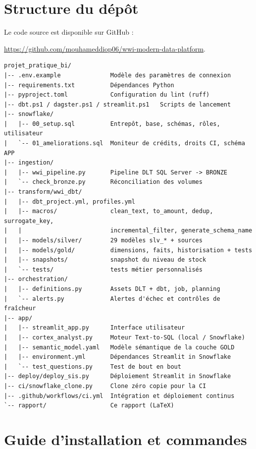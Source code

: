 \chapter{Structure du dépôt}
\label{ann:depot}

Le code source est disponible sur GitHub :

\url{https://github.com/mouhameddiop06/wwi-modern-data-platform}.

\begin{lstlisting}[language={}, numbers=none, caption={Arborescence du projet}]
projet_pratique_bi/
|-- .env.example              Modèle des paramètres de connexion
|-- requirements.txt          Dépendances Python
|-- pyproject.toml            Configuration du lint (ruff)
|-- dbt.ps1 / dagster.ps1 / streamlit.ps1   Scripts de lancement
|-- snowflake/
|   |-- 00_setup.sql          Entrepôt, base, schémas, rôles, utilisateur
|   `-- 01_ameliorations.sql  Moniteur de crédits, droits CI, schéma APP
|-- ingestion/
|   |-- wwi_pipeline.py       Pipeline DLT SQL Server -> BRONZE
|   `-- check_bronze.py       Réconciliation des volumes
|-- transform/wwi_dbt/
|   |-- dbt_project.yml, profiles.yml
|   |-- macros/               clean_text, to_amount, dedup, surrogate_key,
|   |                         incremental_filter, generate_schema_name
|   |-- models/silver/        29 modèles slv_* + sources
|   |-- models/gold/          dimensions, faits, historisation + tests
|   |-- snapshots/            snapshot du niveau de stock
|   `-- tests/                tests métier personnalisés
|-- orchestration/
|   |-- definitions.py        Assets DLT + dbt, job, planning
|   `-- alerts.py             Alertes d'échec et contrôles de fraîcheur
|-- app/
|   |-- streamlit_app.py      Interface utilisateur
|   |-- cortex_analyst.py     Moteur Text-to-SQL (local / Snowflake)
|   |-- semantic_model.yaml   Modèle sémantique de la couche GOLD
|   |-- environment.yml       Dépendances Streamlit in Snowflake
|   `-- test_questions.py     Test de bout en bout
|-- deploy/deploy_sis.py      Déploiement Streamlit in Snowflake
|-- ci/snowflake_clone.py     Clone zéro copie pour la CI
|-- .github/workflows/ci.yml  Intégration et déploiement continus
`-- rapport/                  Ce rapport (LaTeX)
\end{lstlisting}

\chapter{Guide d'installation et commandes}
\label{ann:commandes}

